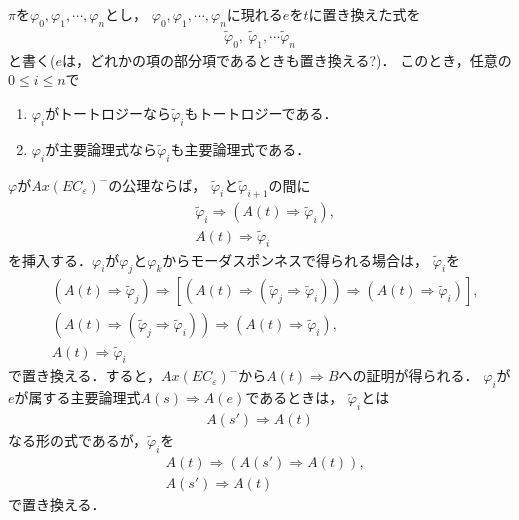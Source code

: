 	$\pi$を$\varphi_{0},\varphi_{1},\cdots,\varphi_{n}$とし，
	$\varphi_{0},\varphi_{1},\cdots,\varphi_{n}$に現れる$e$を$t$に置き換えた式を
	\begin{align}
		\tilde{\varphi}_{0},\ \tilde{\varphi}_{1},\cdots \tilde{\varphi}_{n}
	\end{align}
	と書く($e$は，どれかの項の部分項であるときも置き換える?)．
	このとき，任意の$0 \leq i \leq n$で
	\begin{enumerate}
		\item $\varphi_{i}$がトートロジーなら$\tilde{\varphi}_{i}$もトートロジーである．
		\item $\varphi_{i}$が主要論理式なら$\tilde{\varphi}_{i}$も主要論理式である．
	\end{enumerate}
	
	$\varphi$が$Ax(EC_{\varepsilon})^{-}$の公理ならば，
	$\tilde{\varphi}_{i}$と$\tilde{\varphi}_{i+1}$の間に
	\begin{align}
		&\tilde{\varphi}_{i} \Longrightarrow 
		\left( A(t) \Longrightarrow \tilde{\varphi}_{i} \right), \\
		&A(t) \Longrightarrow \tilde{\varphi}_{i}
	\end{align}
	を挿入する．$\varphi_{i}$が$\varphi_{j}$と$\varphi_{k}$からモーダスポンネスで得られる場合は，
	$\tilde{\varphi}_{i}$を
	\begin{align}
		&\left( A(t) \Longrightarrow \tilde{\varphi}_{j} \right)
		\Longrightarrow \left[ \left( A(t) \Longrightarrow 
		\left( \tilde{\varphi}_{j}\Longrightarrow \tilde{\varphi}_{i} \right) \right)
		\Longrightarrow \left( A(t) \Longrightarrow \tilde{\varphi}_{i} \right) \right], \\
		&\left( A(t) \Longrightarrow 
		\left( \tilde{\varphi}_{j}\Longrightarrow \tilde{\varphi}_{i} \right) \right)
		\Longrightarrow \left( A(t) \Longrightarrow \tilde{\varphi}_{i} \right), \\
		&A(t) \Longrightarrow \tilde{\varphi}_{i}
	\end{align}
	で置き換える．すると，$Ax(EC_{\varepsilon})^{-}$から$A(t) \Longrightarrow B$への証明が得られる．
	$\varphi_{i}$が$e$が属する主要論理式$A(s) \Longrightarrow A(e)$であるときは，
	$\tilde{\varphi}_{i}$とは
	\begin{align}
		A(s') \Longrightarrow A(t)
	\end{align}
	なる形の式であるが，$\tilde{\varphi}_{i}$を
	\begin{align}
		&A(t) \Longrightarrow \left(A(s') \Longrightarrow A(t)　\right), \\
		&A(s') \Longrightarrow A(t)
	\end{align}
	で置き換える．
	
